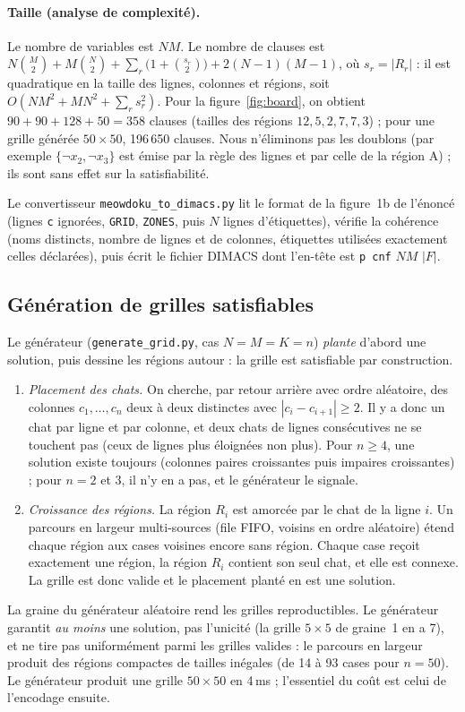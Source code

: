 \documentclass[11pt,a4paper]{article}
\begin{document}
\paragraph{Taille (analyse de complexité).} Le nombre de variables est $NM$. Le nombre de clauses est $N\binom M2+M\binom N2+\sum_{r}\bigl(1+\binom{s_r}2\bigr)+2(N-1)(M-1)$, où $s_r=|R_r|$ : il est quadratique en la taille des lignes, colonnes et régions, soit $O(NM^2+MN^2+\sum_r s_r^2)$. Pour la figure~\ref{fig:board}, on obtient $90+90+128+50=358$ clauses (tailles des régions $12,5,2,7,7,3$) ; pour une grille générée $50\times50$, 196\,650 clauses. Nous n'éliminons pas les doublons (par exemple $\{\neg x_2,\neg x_3\}$ est émise par la règle des lignes et par celle de la région A) ; ils sont sans effet sur la satisfiabilité.

Le convertisseur \texttt{meowdoku\_to\_dimacs.py} lit le format de la figure~1b de l'énoncé (lignes \texttt{c} ignorées, \texttt{GRID}, \texttt{ZONES}, puis $N$ lignes d'étiquettes), vérifie la cohérence (noms distincts, nombre de lignes et de colonnes, étiquettes utilisées exactement celles déclarées), puis écrit le fichier DIMACS dont l'en-tête est \texttt{p cnf} $NM$ $|F|$.

\subsection{Génération de grilles satisfiables}

Le générateur (\texttt{generate\_grid.py}, cas $N=M=K=n$) \emph{plante} d'abord une solution, puis dessine les régions autour : la grille est satisfiable par construction.
\begin{enumerate}[label=\textbf{\arabic*.}]
\item \emph{Placement des chats.} On cherche, par retour arrière avec ordre aléatoire, des colonnes $c_1,\dots,c_n$ deux à deux distinctes avec $|c_i-c_{i+1}|\ge2$. Il y a donc un chat par ligne et par colonne, et deux chats de lignes consécutives ne se touchent pas (ceux de lignes plus éloignées non plus). Pour $n\ge4$, une solution existe toujours (colonnes paires croissantes puis impaires croissantes) ; pour $n=2$ et $3$, il n'y en a pas, et le générateur le signale.
\item \emph{Croissance des régions.} La région $R_i$ est amorcée par le chat de la ligne $i$. Un parcours en largeur multi-sources (file FIFO, voisins en ordre aléatoire) étend chaque région aux cases voisines encore sans région. Chaque case reçoit exactement une région, la région $R_i$ contient son seul chat, et elle est connexe. La grille est donc valide et le placement planté en est une solution.
\end{enumerate}
La graine du générateur aléatoire rend les grilles reproductibles. Le générateur garantit \emph{au moins} une solution, pas l'unicité (la grille $5\times5$ de graine~1 en a 7), et ne tire pas uniformément parmi les grilles valides : le parcours en largeur produit des régions compactes de tailles inégales (de 14 à 93 cases pour $n=50$). Le générateur produit une grille $50\times50$ en 4\,ms ; l'essentiel du coût est celui de l'encodage ensuite.
\end{document}
